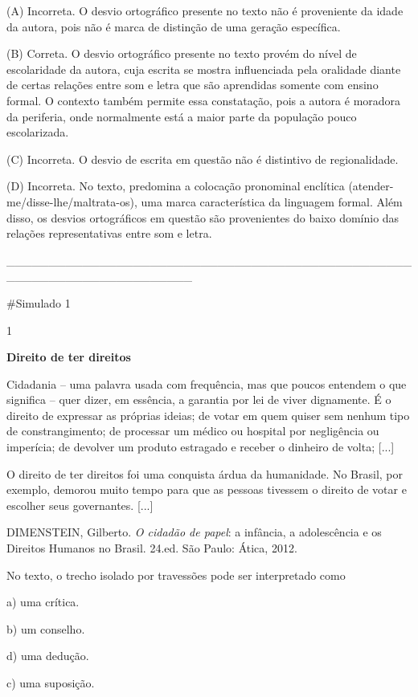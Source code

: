 (A) Incorreta. O desvio ortográfico presente no texto não é proveniente
da idade da autora, pois não é marca de distinção de uma geração
específica.

(B) Correta. O desvio ortográfico presente no texto provém do nível de
escolaridade da autora, cuja escrita se mostra influenciada pela
oralidade diante de certas relações entre som e letra que são aprendidas
somente com ensino formal. O contexto também permite essa constatação,
pois a autora é moradora da periferia, onde normalmente está a maior
parte da população pouco escolarizada.

(C) Incorreta. O desvio de escrita em questão não é distintivo de
regionalidade.

(D) Incorreta. No texto, predomina a colocação pronominal enclítica
(atender-me/disse-lhe/maltrata-os), uma marca característica da
linguagem formal. Além disso, os desvios ortográficos em questão são
provenientes do baixo domínio das relações representativas entre som e
letra.

{\_\_\_\_\_\_\_\_\_\_\_\_\_\_\_\_\_\_\_\_\_\_\_\_\_\_\_\_\_\_\_\_\_\_\_\_\_\_\_\_\_\_\_\_\_\_\_\_\_\_\_\_\_\_\_\_\_\_\_\_\_\_\_\_\_\_\_\_\_\_}

\#Simulado 1

\num{1}

\textbf{Direito de ter direitos}

Cidadania -- uma palavra usada com frequência, mas que poucos entendem o
que significa -- quer dizer, em essência, a garantia por lei de viver
dignamente. É o direito de expressar as próprias ideias; de votar em
quem quiser sem nenhum tipo de constrangimento; de processar um médico
ou hospital por negligência ou imperícia; de devolver um produto
estragado e receber o dinheiro de volta; {[}...{]}

O direito de ter direitos foi uma conquista árdua da humanidade. No
Brasil, por exemplo, demorou muito tempo para que as pessoas tivessem o
direito de votar e escolher seus governantes. {[}...{]}

DIMENSTEIN, Gilberto. \emph{O cidadão de papel}: a infância, a
adolescência e os Direitos Humanos no Brasil. 24.ed. São Paulo: Ática,
2012.

No texto, o trecho isolado por travessões pode ser interpretado como

a) uma crítica.

b) um conselho.

d) uma dedução.

c) uma suposição.

